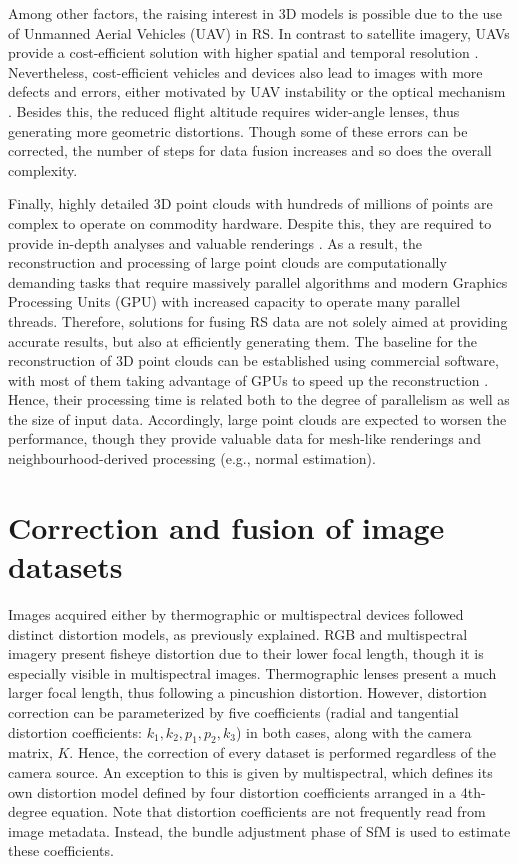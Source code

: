 Among other factors, the raising interest in 3D models is possible due to the use of Unmanned Aerial Vehicles (UAV) in RS. In contrast to satellite imagery, UAVs provide a cost-efficient solution with higher spatial and temporal resolution \cite{singh_bibliometric_2022}. Nevertheless, cost-efficient vehicles and devices also lead to images with more defects and errors, either motivated by UAV instability \cite{akhoundi_khezrabad_new_2022} or the optical mechanism \cite{mohamad_screening_2021, lopez_framework_2021}. Besides this, the reduced flight altitude requires wider-angle lenses, thus generating more geometric distortions. Though some of these errors can be corrected, the number of steps for data fusion increases and so does the overall complexity. 

Finally, highly detailed 3D point clouds with hundreds of millions of points are complex to operate on commodity hardware. Despite this, they are required to provide in-depth analyses and valuable renderings \cite{schutz_rendering_2021}. As a result, the reconstruction and processing of large point clouds are computationally demanding tasks that require massively parallel algorithms and modern Graphics Processing Units (GPU) with increased capacity to operate many parallel threads. Therefore, solutions for fusing RS data are not solely aimed at providing accurate results, but also at efficiently generating them. The baseline for the reconstruction of 3D point clouds can be established using commercial software, with most of them taking advantage of GPUs to speed up the reconstruction \cite{jiang_efficient_2020}. Hence, their processing time is related both to the degree of parallelism as well as the size of input data. Accordingly, large point clouds are expected to worsen the performance, though they provide valuable data for mesh-like renderings and neighbourhood-derived processing (e.g., normal estimation).   

\section{Correction and fusion of image datasets}

Images acquired either by thermographic or multispectral devices followed distinct distortion models, as previously explained. RGB and multispectral imagery present fisheye distortion due to their lower focal length, though it is especially visible in multispectral images. Thermographic lenses present a much larger focal length, thus following a pincushion distortion. However, distortion correction can be parameterized by five coefficients (radial and tangential distortion coefficients: $k_1, k_2, p_1, p_2, k_3$) in both cases, along with the camera matrix, $K$. Hence, the correction of every dataset is performed regardless of the camera source. An exception to this is given by multispectral, which defines its own distortion model defined by four distortion coefficients arranged in a 4th-degree equation. Note that distortion coefficients are not frequently read from image metadata. Instead, the bundle adjustment phase of SfM is used to estimate these coefficients. 

